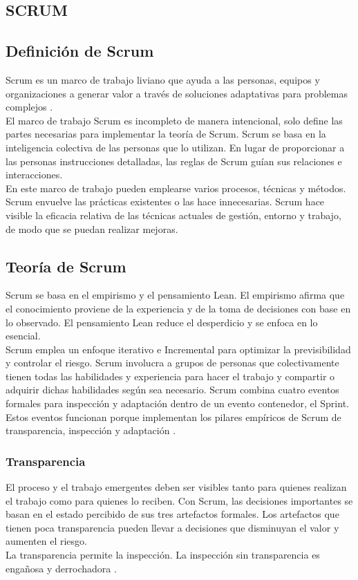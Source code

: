 \begin{spacing}{1.5}
\section{SCRUM}
	\subsection{Definici\'{o}n de Scrum}
		Scrum es un marco de trabajo liviano que ayuda a las personas, equipos y organizaciones a generar valor
		a través de soluciones adaptativas para problemas complejos \cite{chap2_scrum}.\\
		El marco de trabajo Scrum es incompleto de manera intencional, solo define las
		partes necesarias para implementar la teoría de Scrum. Scrum se basa en la inteligencia colectiva de las
		personas que lo utilizan. En lugar de proporcionar a las personas instrucciones detalladas, las reglas de
		Scrum guían sus relaciones e interacciones.\\
		En este marco de trabajo pueden emplearse varios procesos, técnicas y métodos. Scrum envuelve las
		prácticas existentes o las hace innecesarias. Scrum hace visible la eficacia relativa de las técnicas
		actuales de gestión, entorno y trabajo, de modo que se puedan realizar mejoras.
	\subsection{Teor\'{i}a de Scrum}
		Scrum se basa en el empirismo y el pensamiento Lean. El empirismo afirma que el conocimiento
		proviene de la experiencia y de la toma de decisiones con base en lo observado. El pensamiento Lean
		reduce el desperdicio y se enfoca en lo esencial.\\
		Scrum emplea un enfoque iterativo e Incremental para optimizar la previsibilidad y controlar el riesgo.
		Scrum involucra a grupos de personas que colectivamente tienen todas las habilidades y experiencia
		para hacer el trabajo y compartir o adquirir dichas habilidades según sea necesario.
		Scrum combina cuatro eventos formales para inspección y adaptación dentro de un evento contenedor,
		el Sprint. Estos eventos funcionan porque implementan los pilares empíricos de Scrum de transparencia,
		inspección y adaptación \cite{chap2_scrum}.
		\subsubsection{Transparencia}
			El proceso y el trabajo emergentes deben ser visibles tanto para quienes realizan el trabajo como para
			quienes lo reciben. Con Scrum, las decisiones importantes se basan en el estado percibido de sus tres artefactos formales. Los artefactos que tienen poca transparencia pueden llevar a decisiones que
			disminuyan el valor y aumenten el riesgo.\\
			La transparencia permite la inspección. La inspección sin transparencia es engañosa y derrochadora \cite{chap2_scrum}.

\end{spacing}
